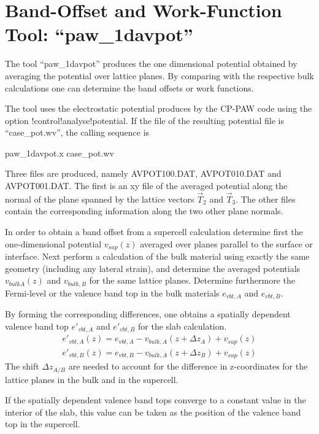 \documentclass[final,12pt]{article}
\begin{document}
{{{{%
\newpage
\section{Band-Offset and Work-Function Tool: ``paw\_1davpot''}
The tool ``paw\_1davpot'' produces the one dimensional potential
obtained by averaging the potential over lattice planes. By comparing
with the respective bulk calculations one can determine the band
offsets or work functions.

The tool uses the electrostatic potential produces by the CP-PAW code
using the option !control!analyse!potential. If the file of the
resulting potential file is ``case\_pot.wv'',  the calling sequence is
\begin{center}
paw\_1davpot.x case\_pot.wv
\end{center}
Three files are produced, namely AVPOT100.DAT, AVPOT010.DAT and
AVPOT001.DAT. The first is an xy file of the averaged potential along
the normal of the plane spanned by the lattice vectors $\vec{T}_2$ and
$\vec{T}_3$. The other files contain the corresponding information
along the two other plane normals.

In order to obtain a band offset from a supercell calculation
determine first the one-dimensional potential $v_{sup}(z)$ averaged
over planes parallel to the surface or interface. Next perform a
calculation of the bulk material using exactly the same geometry
(including any lateral strain), and determine the averaged potentials
$v_{bulk A}(z)$ and $v_{bulk,B}$ for the same lattice planes.
Determine furthermore the Fermi-level or the valence band top in the bulk
materials $e_{vbt,A}$ and $e_{vbt,B}$.

By forming the corresponding differences, one obtains a spatially
dependent valence band top $e'_{vbt,A}$ and $e'_{vbt,B}$ 
for the slab calculation.
\begin{eqnarray*}
e'_{vbt,A}(z)=e_{vbt,A}-v_{bulk,A}(z+\Delta z_A)+v_{sup}(z)
\\
e'_{vbt,B}(z)=e_{vbt,B}-v_{bulk,A}(z+\Delta z_B)+v_{sup}(z)
\end{eqnarray*}
The shift $\Delta z_{A/B}$ are needed to account for the difference in
z-coordinates for the lattice planes in the bulk and in the supercell.

If the spatially dependent valence band tops converge to a constant
value in the interior of the slab, this value can be taken as the
position of the valence band top in the supercell.
 

}}}}
\end{document}

